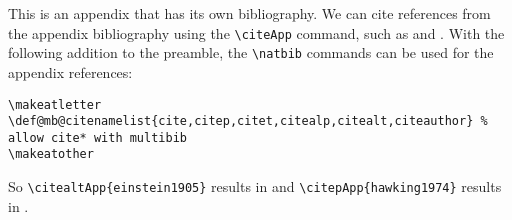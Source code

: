 \documentclass{article}
\begin{document}
This is an appendix that has its own bibliography. We can cite references from the appendix bibliography using the \verb|\citeApp| command, such as  and . With the following addition to the preamble, the \verb|\natbib| commands can be used for the appendix references:

\begin{verbatim} 
\makeatletter 
\def@mb@citenamelist{cite,citep,citet,citealp,citealt,citeauthor} % allow cite* with multibib 
\makeatother 
\end{verbatim}

So \verb|\citealtApp{einstein1905}| results in  and \verb|\citepApp{hawking1974}| results in .

\end{document}
